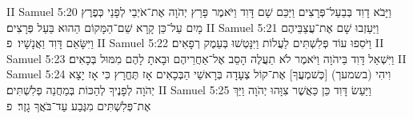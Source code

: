 II Samuel 5:20	וַיָּבֹא דָוִד בְּבַעַל־פְּרָצִים וַיַּכֵּם שָׁם דָּוִד וַיֹּאמֶר פָּרַץ יְהֹוָה אֶת־אֹיְבַי לְפָנַי כְּפֶרֶץ מָיִם עַל־כֵּן קָרָא שֵׁם־הַמָּקוֹם הַהוּא בַּעַל פְּרָצִים׃
II Samuel 5:21	וַיַּעַזְבוּ שָׁם אֶת־עֲצַבֵּיהֶם וַיִּשָּׂאֵם דָּוִד וַאֲנָשָׁיו׃ {פ}
II Samuel 5:22	וַיֹּסִפוּ עוֹד פְּלִשְׁתִּים לַעֲלוֹת וַיִּנָּטְשׁוּ בְּעֵמֶק רְפָאִים׃
II Samuel 5:23	וַיִּשְׁאַל דָּוִד בַּיהֹוָה וַיֹּאמֶר לֹא תַעֲלֶה הָסֵב אֶל־אַחֲרֵיהֶם וּבָאתָ לָהֶם מִמּוּל בְּכָאִים׃
II Samuel 5:24	וִיהִי (בשמעך) [כְּשׁמְעֲךָ] אֶת־קוֹל צְעָדָה בְּרָאשֵׁי הַבְּכָאִים אָז תֶּחֱרָץ כִּי אָז יָצָא יְהֹוָה לְפָנֶיךָ לְהַכּוֹת בְּמַחֲנֵה פְלִשְׁתִּים׃
II Samuel 5:25	וַיַּעַשׂ דָּוִד כֵּן כַּאֲשֶׁר צִוָּהוּ יְהֹוָה וַיַּךְ אֶת־פְּלִשְׁתִּים מִגֶּבַע עַד־בֹּאֲךָ גָזֶר׃ {פ}

